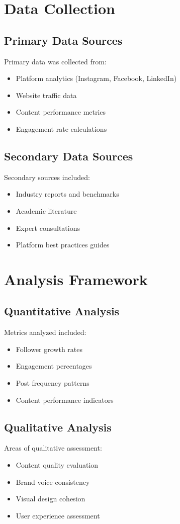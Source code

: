 \documentclass[12pt]{report}
\begin{document}
\section{Data Collection}
\subsection{Primary Data Sources}
Primary data was collected from:
\begin{itemize}
    \item Platform analytics (Instagram, Facebook, LinkedIn)
    \item Website traffic data
    \item Content performance metrics
    \item Engagement rate calculations
\end{itemize}

\subsection{Secondary Data Sources}
Secondary sources included:
\begin{itemize}
    \item Industry reports and benchmarks
    \item Academic literature
    \item Expert consultations
    \item Platform best practices guides
\end{itemize}

\section{Analysis Framework}
\subsection{Quantitative Analysis}
Metrics analyzed included:
\begin{itemize}
    \item Follower growth rates
    \item Engagement percentages
    \item Post frequency patterns
    \item Content performance indicators
\end{itemize}

\subsection{Qualitative Analysis}
Areas of qualitative assessment:
\begin{itemize}
    \item Content quality evaluation
    \item Brand voice consistency
    \item Visual design cohesion
    \item User experience assessment
\end{itemize}
\end{document}
